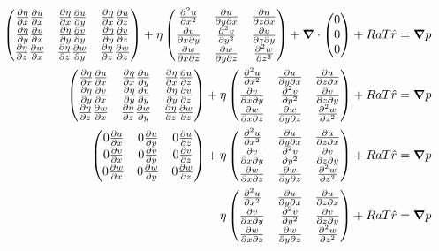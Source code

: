 \begin{align}
\begin{pmatrix} \pd{\eta}{x} \pd{u}{x} & \pd{\eta}{x} \pd{u}{y} & \pd{\eta}{x} \pd{u}{z} \\ \pd{\eta}{y} \pd{v}{x} & \pd{\eta}{y} \pd{v}{y} & \pd{\eta}{y} \pd{v}{z} \\ \pd{\eta}{z} \pd{w}{x} & \pd{\eta}{z} \pd{w}{y} & \pd{\eta}{z} \pd{w}{z} \end{pmatrix} + \eta \begin{pmatrix} \pdd{u}{x} & \pd{u}{y \partial x} & \pd{u}{z \partial x} \\ \pd{v}{x \partial y} & \pdd{v}{y} & \pd{v}{z \partial y} \\ \pd{w}{x \partial z} & \pd{w}{y \partial z} & \pdd{w}{z} \end{pmatrix} + \div{\begin{pmatrix} 0 \\ 0 \\ 0 \end{pmatrix}} + Ra T \hat{r} & = \grad{p} \\
\begin{pmatrix} \pd{\eta}{x} \pd{u}{x} & \pd{\eta}{x} \pd{u}{y} & \pd{\eta}{x} \pd{u}{z} \\ \pd{\eta}{y} \pd{v}{x} & \pd{\eta}{y} \pd{v}{y} & \pd{\eta}{y} \pd{v}{z} \\ \pd{\eta}{z} \pd{w}{x} & \pd{\eta}{z} \pd{w}{y} & \pd{\eta}{z} \pd{w}{z} \end{pmatrix} + \eta \begin{pmatrix} \pdd{u}{x} & \pd{u}{y \partial x} & \pd{u}{z \partial x} \\ \pd{v}{x \partial y} & \pdd{v}{y} & \pd{v}{z \partial y} \\ \pd{w}{x \partial z} & \pd{w}{y \partial z} & \pdd{w}{z} \end{pmatrix} + Ra T \hat{r} & = \grad{p} \\
\begin{pmatrix} 0 \pd{u}{x} & 0 \pd{u}{y} & 0 \pd{u}{z} \\ 0 \pd{v}{x} & 0 \pd{v}{y} & 0 \pd{v}{z} \\ 0 \pd{w}{x} & 0 \pd{w}{y} & 0 \pd{w}{z} \end{pmatrix} + \eta \begin{pmatrix} \pdd{u}{x} & \pd{u}{y \partial x} & \pd{u}{z \partial x} \\ \pd{v}{x \partial y} & \pdd{v}{y} & \pd{v}{z \partial y} \\ \pd{w}{x \partial z} & \pd{w}{y \partial z} & \pdd{w}{z} \end{pmatrix} + Ra T \hat{r} & = \grad{p} \\
\eta \begin{pmatrix} \pdd{u}{x} & \pd{u}{y \partial x} & \pd{u}{z \partial x} \\ \pd{v}{x \partial y} & \pdd{v}{y} & \pd{v}{z \partial y} \\ \pd{w}{x \partial z} & \pd{w}{y \partial z} & \pdd{w}{z} \end{pmatrix} + Ra T \hat{r} & = \grad{p}
\end{align}
